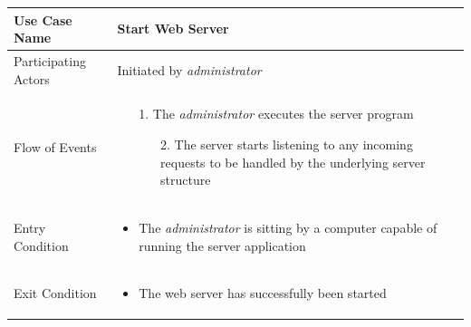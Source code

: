 \begin{center}
	\begin{tabular}{ | l | p{10cm} |  }
		 \hline
		Use Case Name & Start Web Server \\ \hline
		Participating Actors & Initiated by \emph{administrator} \\ \hline
		Flow of Events & \begin{enumerate}
						\item[1.] The \emph{administrator} executes the server program
						\begin{enumerate}
							\item[2.] The server starts listening to any incoming requests to be handled by the underlying server structure
						\end{enumerate}
					\end{enumerate} \\ \hline
		Entry Condition & \begin{itemize}
						\item The \emph{administrator} is sitting by a computer capable of running the server application
					\end{itemize} \\ \hline
		Exit Condition & \begin{itemize}
						\item The web server has successfully been started
					\end{itemize} \\
		\hline
	\end{tabular}
\end{center}


